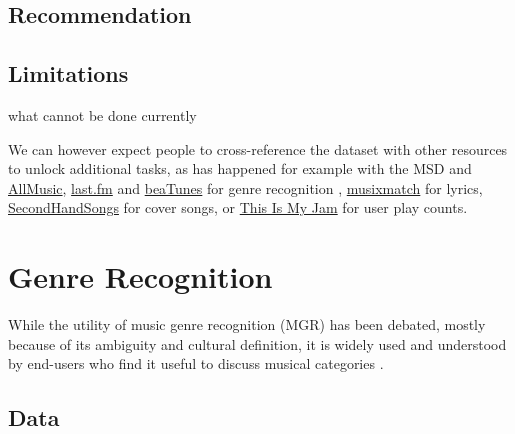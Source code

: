 \documentclass{article}
\newcommand{\todo}[1]{{\color{red} #1 }}
\begin{document}
\subsection{Recommendation} %

\subsection{Limitations}

\todo{what cannot be done currently}


We can however expect people to cross-reference the dataset with other resources to unlock additional tasks, as has happened for example with the MSD and \href{http://www.allmusic.com}{AllMusic}, \href{https://www.last.fm}{last.fm} and \href{https://beatunes.com}{beaTunes} for genre recognition \cite{msd_features, msd_genres}, \href{https://musixmatch.com}{musixmatch} for lyrics, \href{https://secondhandsongs.com}{SecondHandSongs} for cover songs, or \href{https://www.thisismyjam.com}{This Is My Jam} for user play counts.


\section{Genre Recognition} %


While the utility of music genre recognition (MGR) has been debated, mostly because of its ambiguity and cultural definition, it is widely used and understood by end-users who find it useful to discuss musical categories \cite{mgr_why}.

\subsection{Data}
\end{document}
